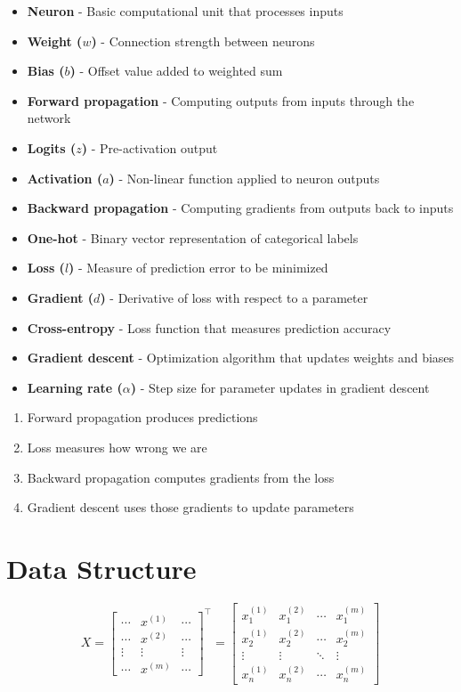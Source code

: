 \documentclass[12pt]{article}
\newcommand{\SectionTitle}[1]{\section*{\centering #1}\bigskip}
\begin{document}
\begin{itemize}
  \item \textbf{Neuron} - Basic computational unit that processes inputs
  \item \textbf{Weight ($w$)} - Connection strength between neurons
  \item \textbf{Bias ($b$)} - Offset value added to weighted sum
  \item \textbf{Forward propagation} - Computing outputs from inputs through the network
  \item \textbf{Logits ($z$)} - Pre-activation output
  \item \textbf{Activation ($a$)} - Non-linear function applied to neuron outputs
  \item \textbf{Backward propagation} - Computing gradients from outputs back to inputs
  \item \textbf{One-hot} - Binary vector representation of categorical labels
  \item \textbf{Loss ($l$)} - Measure of prediction error to be minimized
  \item \textbf{Gradient ($d$)} - Derivative of loss with respect to a parameter
  \item \textbf{Cross-entropy} - Loss function that measures prediction accuracy
  \item \textbf{Gradient descent} - Optimization algorithm that updates weights and biases
  \item \textbf{Learning rate ($\alpha$)} - Step size for parameter updates in gradient descent
\end{itemize}

\bigskip

\begin{enumerate}
  \item Forward propagation produces predictions
  \item Loss measures how wrong we are
  \item Backward propagation computes gradients from the loss
  \item Gradient descent uses those gradients to update parameters
\end{enumerate}

\clearpage

\SectionTitle{Data Structure}

\[
X =
\begin{bmatrix}
\cdots & x^{(1)} & \cdots \\
\cdots & x^{(2)} & \cdots \\
\vdots & \vdots & \vdots \\
\cdots & x^{(m)} & \cdots
\end{bmatrix}^{\top}
=
\begin{bmatrix}
x^{(1)}_1 & x^{(2)}_1 & \cdots & x^{(m)}_1 \\
x^{(1)}_2 & x^{(2)}_2 & \cdots & x^{(m)}_2 \\
\vdots & \vdots & \ddots & \vdots \\
x^{(1)}_n & x^{(2)}_n & \cdots & x^{(m)}_n
\end{bmatrix}
\]
\end{document}
